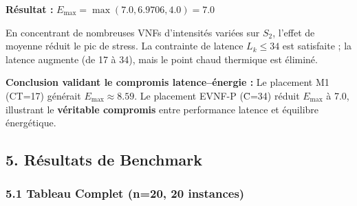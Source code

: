 \documentclass{article}
\begin{document}
\textbf{Résultat :} $E_{\max} = \max(7.0, 6.9706, 4.0) = \boxed{7.0}$

En concentrant de nombreuses VNFs d'intensités variées sur $S_2$, l'effet de moyenne réduit le pic de stress. La contrainte de latence $L_k \le 34$ est satisfaite ; la latence augmente (de 17 à 34), mais le point chaud thermique est éliminé.

\textbf{Conclusion validant le compromis latence--énergie :} Le placement M1 (CT=17) générait $E_{\max} \approx 8.59$. Le placement EVNF-P (C̄=34) réduit $E_{\max}$ à 7.0, illustrant le \textbf{véritable compromis} entre performance latence et équilibre énergétique.

\subsection{5. Résultats de Benchmark}

\subsubsection{5.1 Tableau Complet (n=20, 20 instances)}
\end{document}

